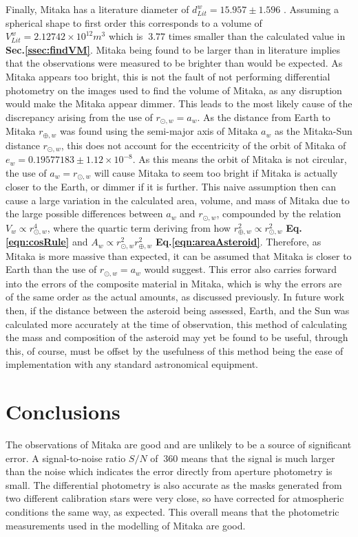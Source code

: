 \documentclass[10pt,twocolumn]{revtex4}    %
\newcommand*{\astrosun}{{\odot}}
\newcommand*{\earth}{{\oplus}}
\newcommand{\refeq}[1]{\textbf{Eq.#1}}
\newcommand{\E}[1]{\times10^{#1}}
\newcommand{\rem}{r_{\earth,w}}
\newcommand{\rsm}{r_{\astrosun,w}}
\begin{document}
Finally, Mitaka has a literature diameter of $d^w_{Lit} = 15.957 \pm 1.596$ \cite{mitakaAlbedo}. Assuming a spherical shape to first order this corresponds to a volume of $V^w_{Lit} = 2.12742\E{12} m^3$ which is $~3.77$ times smaller than the calculated value in \textbf{Sec.\ref{ssec:findVM}}. Mitaka being found to be larger than in literature implies that the observations were measured to be brighter than would be expected. As Mitaka appears too bright, this is not the fault of not performing differential photometry on the images used to find the volume of Mitaka, as any disruption would make the Mitaka appear dimmer. This leads to the most likely cause of the discrepancy arising from the use of $\rsm = a_w$. As the distance from Earth to Mitaka $r_{\earth,w}$ was found using the semi-major axis of Mitaka $a_w$ as the Mitaka-Sun distance $r_{\astrosun,w}$, this does not account for the eccentricity of the orbit of Mitaka of $e_w = 0.19577183 \pm	1.12\E{-8}$. As this means the orbit of Mitaka is not circular, the use of $a_w = r_{\astrosun,w}$ will cause Mitaka to seem too bright if Mitaka is actually closer to the Earth, or dimmer if it is further. This naive assumption then can cause a large variation in the calculated area, volume, and mass of Mitaka due to the large possible differences between $a_w$ and $\rsm$, compounded by the relation $V_w \propto \rsm^4$, where the quartic term deriving from how $\rem^2 \propto \rsm^2$ \refeq{\ref{eqn:cosRule}} and $A_w \propto \rsm^2 \rem^2$ \refeq{\ref{eqn:areaAsteroid}}. Therefore, as Mitaka is more massive than expected, it can be assumed that Mitaka is closer to Earth than the use of $\rsm = a_w$ would suggest. This error also carries forward into the errors of the composite material in Mitaka, which is why the errors are of the same order as the actual amounts, as discussed previously. In future work then, if the distance between the asteroid being assessed, Earth, and the Sun was calculated more accurately at the time of observation, this method of calculating the mass and composition of the asteroid may yet be found to be useful, through this, of course, must be offset by the usefulness of this method being the ease of implementation with any standard astronomical equipment.  

\section{Conclusions}\label{sec:cnclusion}
The observations of Mitaka are good and are unlikely to be a source of significant error. A signal-to-noise ratio $S/N$ of $~360$ means that the signal is much larger than the noise which indicates the error directly from aperture photometry is small. The differential photometry is also accurate as the masks generated from two different calibration stars were very close, so have corrected for atmospheric conditions the same way, as expected. This overall means that the photometric measurements used in the modelling of Mitaka are good.
\end{document}
